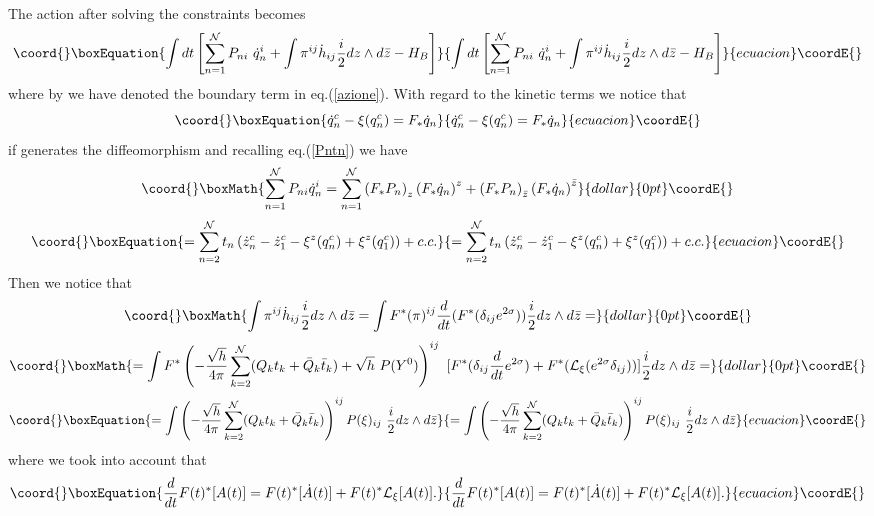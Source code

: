 \documentclass[a4paper,12pt]{article}
\begin{document}
The action \coordHE{} after solving the constraints becomes
\begin{equation}\coord{}\boxEquation{
\int dt \left[\sum_{n=1}^{\cal N} P_{ni}~\dot q^i_n + \int
\pi^{ij}\dot h_{ij} \frac{i}{2}dz\wedge d\bar z -H_B\right] 
}{
\int dt \left[\sum_{n=1}^{\cal N} P_{ni}~\dot q^i_n + \int
\pi^{ij}\dot h_{ij} \frac{i}{2}dz\wedge d\bar z -H_B\right] 
}{ecuacion}\coordE{}\end{equation}
where by \coordHE{} we have denoted the boundary term in
eq.(\ref{azione}). 
With regard to the kinetic terms we notice that 
\begin{equation}\coord{}\boxEquation{
\dot q^c_n-\xi(q^c_n) =F_*\dot q_n
}{
\dot q^c_n-\xi(q^c_n) =F_*\dot q_n
}{ecuacion}\coordE{}\end{equation}
if \coordHE{} generates the diffeomorphism \coordHE{} and recalling
eq.(\ref{Pntn}) we have
$$\coord{}\boxMath{
\sum_{n=1}^{\cal N} P_{ni} \dot q^i_n = \sum_{n=1}^{\cal N}
\left(F_*P_n\right)_z  \left(F_* \dot q_n\right)^z
+\left(F_*P_n\right)_{\bar z}  \left(F_* \dot q_n\right)^{\bar z}
}{dollar}{0pt}\coordE{}$$
\begin{equation}\coord{}\boxEquation{\label{Pdotq}
= \sum_{n=2}^{\cal N} t_n \left(\dot z^c_n -\dot z^c_1 - \xi^z(q^c_n)+
\xi^z(q^c_1)\right) + c.c. 
}{= \sum_{n=2}^{\cal N} t_n \left(\dot z^c_n -\dot z^c_1 - \xi^z(q^c_n)+
\xi^z(q^c_1)\right) + c.c. 
}{ecuacion}\coordE{}\end{equation}
Then we notice that
$$\coord{}\boxMath{
\int \pi^{ij}\dot h_{ij} \frac{i}{2}dz\wedge d \bar z=\int
F^*(\pi)^{ij}\frac{d}{dt}(F^*(\delta_{ij}e^{2\sigma}))\frac{i}{2}dz\wedge
d \bar z= 
}{dollar}{0pt}\coordE{}$$  $$\coord{}\boxMath{
=\int F^*\left(-\frac{\sqrt{h}}{4\pi}\sum_{k=2}^{\cal
N}(Q_k t_k+\bar Q_k\bar t_k)
+\sqrt{h} ~P(Y^0)\right)^{ij}~[F^*(\delta_{ij}\frac{d}{dt}e^{2\sigma})
+F^*({\cal L}_{\xi}(e^{2\sigma}\delta_{ij}))]\frac{i}{2}dz\wedge d \bar z=    
}{dollar}{0pt}\coordE{}$$
\begin{equation}\coord{}\boxEquation{\label{pidoth}
=\int \left(-\frac{\sqrt{h}}{4\pi}\sum_{k=2}^{\cal
N}(Q_k t_k+\bar Q_k\bar
t_k)\right)^{ij}P(\xi)_{ij}~\frac{i}{2}dz\wedge 
d \bar z
}{=\int \left(-\frac{\sqrt{h}}{4\pi}\sum_{k=2}^{\cal
N}(Q_k t_k+\bar Q_k\bar
t_k)\right)^{ij}P(\xi)_{ij}~\frac{i}{2}dz\wedge 
d \bar z
}{ecuacion}\coordE{}\end{equation}
where we took into account that
\begin{equation}\coord{}\boxEquation{
\frac{d}{dt}F(t)^*[A(t)]=F(t)^*[\dot A(t)]+F(t)^*{\cal L}_\xi [A(t)].
}{
\frac{d}{dt}F(t)^*[A(t)]=F(t)^*[\dot A(t)]+F(t)^*{\cal L}_\xi [A(t)].
}{ecuacion}\coordE{}\end{equation}
\end{document}
